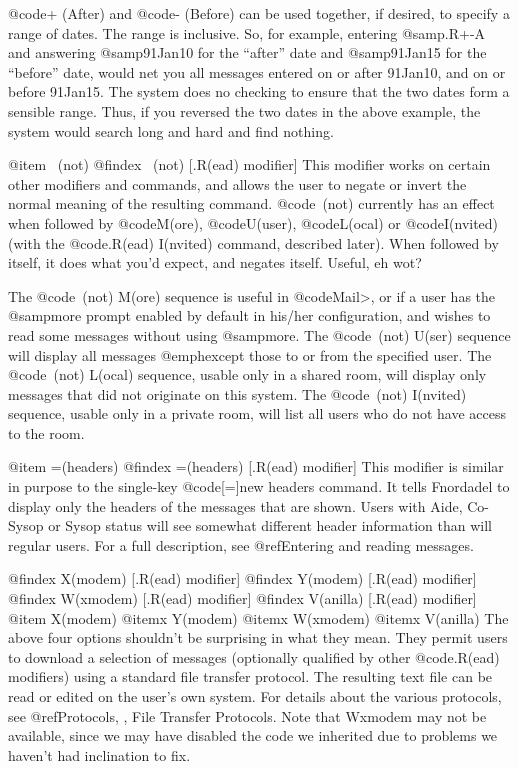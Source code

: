 @code{+ (After)} and @code{- (Before)} can be used together,
if desired, to specify a range of dates.  The range is inclusive.  So,
for example, entering @samp{.R+-A} and answering @samp{91Jan10} for the
``after'' date and @samp{91Jan15} for the ``before'' date, would net
you all messages entered on or after 91Jan10, and on or before 91Jan15.
The system does no checking to ensure that the two dates form a sensible
range.  Thus, if you reversed the two dates in the above example, the
system would search long and hard and find nothing.

@item ~(not)
@findex ~(not) [.R(ead) modifier]
This modifier works on certain other modifiers and
commands, and allows the user to negate or invert the normal
meaning of the resulting command.  @code{~(not)} currently has an
effect when followed by @code{M(ore)}, @code{U(user)}, @code{L(ocal)}
or @code{I(nvited)}
(with the @code{.R(ead) I(nvited)} command, described later).  When
followed by itself, it does what you'd expect, and negates
itself.  Useful, eh wot?

The @code{~(not) M(ore)} sequence is useful in @code{Mail>}, or if
a user has
the @samp{more} prompt enabled by default in his/her configuration,
and wishes to read some messages without using @samp{more}.  The
@code{~(not) U(ser)} sequence will display all messages @emph{except}
those to or from the specified user.  The @code{~(not) L(ocal)}
sequence, usable only in a shared room, will display only
messages that did not originate on this system.  The
@code{~(not) I(nvited)} sequence, usable only in a private room,
will list all users who do not have access to the room.

@item =(headers)
@findex =(headers) [.R(ead) modifier]
This modifier is similar in purpose to the single-key
@code{[=]new headers} command.
It tells Fnordadel to
display only the headers of the messages that are shown.  Users
with Aide, Co-Sysop or Sysop status will see somewhat different header
information than will regular users.  For a full description, see
@ref{Entering and reading messages}.

@findex X(modem) [.R(ead) modifier]
@findex Y(modem) [.R(ead) modifier]
@findex W(xmodem) [.R(ead) modifier]
@findex V(anilla) [.R(ead) modifier]
@item X(modem)
@itemx Y(modem)
@itemx W(xmodem)
@itemx V(anilla)
The above four options shouldn't be surprising in what
they mean.  They permit users to download a selection of
messages (optionally qualified by other @code{.R(ead)} modifiers)
using a standard file transfer protocol.  The resulting text
file can be read or edited on the user's own system.  For
details about the various protocols, see
@ref{Protocols, , File Transfer Protocols}.  Note that Wxmodem
may not be available, since we may have disabled the code we
inherited due to problems we haven't had inclination to fix.

